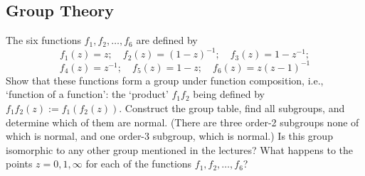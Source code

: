 \documentclass[a4paper]{article}
\begin{document}
\subsection*{Group Theory}
\begin{qns}
The six functions $f_1,f_2,\dots,f_6$ are defined by
$$f_1(z)=z;\quad f_2(z)=(1-z)^{-1};\quad f_3(z)=1-z^{-1};$$
$$f_4(z)=z^{-1};\quad f_5(z)=1-z;\quad f_6(z)=z(z-1)^{-1}$$
Show that these functions form a group under function composition, i.e., ‘function of a function’: the ‘product’ $f_1f_2$ being defined by $f_1f_2(z):=f_1(f_2(z))$. Construct the group table, find all subgroups, and determine which of them are normal. (There are three order-2 subgroups none of which is normal, and one order-3 subgroup, which is normal.) Is this group isomorphic to any other group mentioned in the lectures? What happens to the points $z=0,1,\infty$ for each of the functions $f_1,f_2,\dots,f_6$?
\end{qns}
\end{document}
